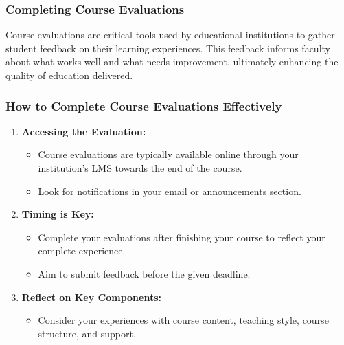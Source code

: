 \documentclass[aspectratio=169]{beamer}
\begin{document}
\begin{frame}[fragile]
    \frametitle{Completing Course Evaluations}
    Course evaluations are critical tools used by educational institutions to gather student feedback on their learning experiences. This feedback informs faculty about what works well and what needs improvement, ultimately enhancing the quality of education delivered.
\end{frame}

\begin{frame}[fragile]
    \frametitle{How to Complete Course Evaluations Effectively}
    \begin{enumerate}
        \item \textbf{Accessing the Evaluation:}
        \begin{itemize}
            \item Course evaluations are typically available online through your institution’s LMS towards the end of the course.
            \item Look for notifications in your email or announcements section.
        \end{itemize}
        
        \item \textbf{Timing is Key:}
        \begin{itemize}
            \item Complete your evaluations after finishing your course to reflect your complete experience.
            \item Aim to submit feedback before the given deadline.
        \end{itemize}
        
        \item \textbf{Reflect on Key Components:}
        \begin{itemize}
            \item Consider your experiences with course content, teaching style, course structure, and support.
        \end{itemize}
    \end{enumerate}
\end{frame}
\end{document}
